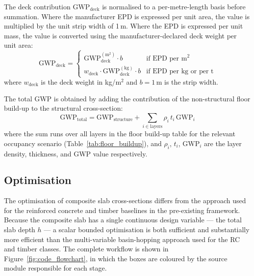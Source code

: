 The deck contribution $\mathrm{GWP}_\mathrm{deck}$ is normalised to a per-metre-length basis before summation. Where the manufacturer EPD is expressed per unit area, the value is multiplied by the unit strip width of 1\,m. Where the EPD is expressed per unit mass, the value is converted using the manufacturer-declared deck weight per unit area:
\begin{equation}
    \mathrm{GWP}_\mathrm{deck} = 
    \begin{cases}
    \mathrm{GWP}_\mathrm{deck}^{(\mathrm{m}^2)} \cdot b           & \text{if EPD per m}^2 \\
    w_\mathrm{deck} \cdot \mathrm{GWP}_\mathrm{deck}^{(\mathrm{kg})} \cdot b & \text{if EPD per kg or per t}
    \end{cases}
    \label{eq:gwp_deck_norm}
\end{equation}
where $w_\mathrm{deck}$ is the deck weight in kg/m$^2$ and $b = 1$\,m is the strip width.

The total GWP is obtained by adding the contribution of the non-structural floor build-up to the structural cross-section:
\begin{equation}
    \mathrm{GWP}_\mathrm{total} = \mathrm{GWP}_\mathrm{structure} + \sum_{i \in \mathrm{layers}} \rho_i \, t_i \, \mathrm{GWP}_i
    \label{eq:gwp_total}
\end{equation}
where the sum runs over all layers in the floor build-up table for the relevant occupancy scenario (Table~\ref{tab:floor_buildup}), and $\rho_i$, $t_i$, $\mathrm{GWP}_i$ are the layer density, thickness, and GWP value respectively.

\subsection{Optimisation}
\label{sec:optimisation}
The optimisation of composite slab cross-sections differs from the approach used for the reinforced concrete and timber baselines in the pre-existing framework. Because the composite slab has a single continuous design variable --- the total slab depth $h$ --- a scalar bounded optimisation is both sufficient and substantially more efficient than the multi-variable basin-hopping approach used for the RC and timber classes. The complete workflow is shown in Figure~\ref{fig:code_flowchart}, in which the boxes are coloured by the source module responsible for each stage.

